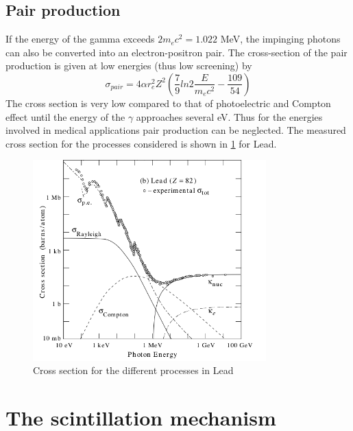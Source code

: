 \subsection{Pair production}
If the energy of the gamma exceeds $2m_{e}c^{2} = 1.022$ MeV, the impinging photons can also be converted into an electron-positron pair. The cross-section of the pair production is given at low energies (thus low screening) by
\begin{equation}
\sigma _{pair} = 4\alpha r_{e}^{2} Z^{2} \left( \frac{7}{9}ln2\frac{E}{m_{e}c^{2}} - \frac{109}{54}\right)
\end{equation}
The cross section is very low compared to that of photoelectric and Compton effect until the energy of the $\gamma$ approaches several eV. Thus for the energies involved in medical applications pair production can be neglected.
The measured cross section for the processes considered is shown in \ref{fig:cross_section} for Lead. 
\begin{figure}[htbp]
\centering
\includegraphics[width=9cm]{../Pictures/Chapter_2/sigma_gamma.pdf}
\caption[$\gamma$ cross section]{Cross section for the different processes in Lead}
\label{fig:cross_section}
\end{figure}
\newpage
\section{The scintillation mechanism}

